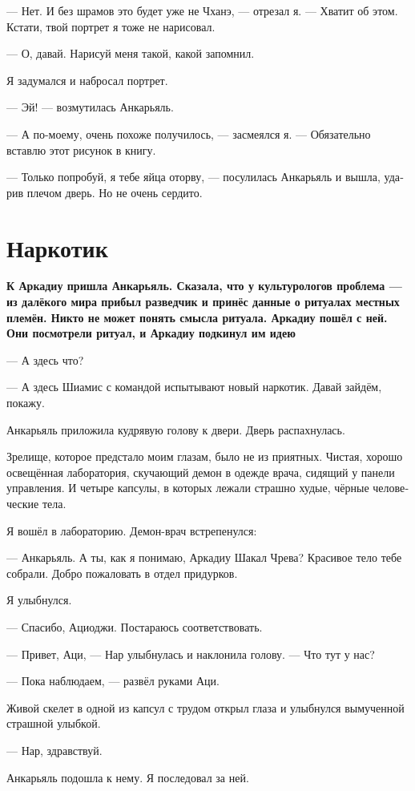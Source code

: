 \documentclass[a4paper,12pt,fleqn]{book}\usepackage{polyglossia}\setdefaultlanguage[babelshorthands=true]{russian}\setotherlanguage{english}\defaultfontfeatures{Ligatures=TeX,Mapping=tex-text}\usepackage{xcolor}\newcommand{\ml}[3]{#2}
\begin{document}
{--- Нет.
И без шрамов это будет уже не Чханэ, --- отрезал я.
--- Хватит об этом.
Кстати, твой портрет я тоже не нарисовал.

--- О, давай.
Нарисуй меня такой, какой запомнил.

Я задумался и набросал портрет.

--- Эй! --- возмутилась Анкарьяль.

--- А по-моему, очень похоже получилось, --- засмеялся я.
--- Обязательно вставлю этот рисунок в книгу.

--- Только попробуй, я тебе яйца оторву, --- посулилась Анкарьяль и вышла, ударив плечом дверь.
Но не очень сердито.

\section{Наркотик}

\textbf{К Аркадиу пришла Анкарьяль.
Сказала, что у культурологов проблема --- из далёкого мира прибыл разведчик и принёс данные о ритуалах местных племён.
Никто не может понять смысла ритуала.
Аркадиу пошёл с ней.
Они посмотрели ритуал, и Аркадиу подкинул им идею}

--- А здесь что?

--- А здесь Шиамис с командой испытывают новый наркотик.
Давай зайдём, покажу.

Анкарьяль приложила кудрявую голову к двери.
Дверь распахнулась.

Зрелище, которое предстало моим глазам, было не из приятных.
Чистая, хорошо освещённая лаборатория, скучающий демон в одежде врача, сидящий у панели управления.
И четыре капсулы, в которых лежали страшно худые, чёрные человеческие тела.

Я вошёл в лабораторию.
Демон-врач встрепенулся:

--- Анкарьяль.
А ты, как я понимаю, Аркадиу Шакал Чрева?
Красивое тело тебе собрали.
Добро пожаловать в отдел придурков.

Я улыбнулся.

--- Спасибо, Ациоджи.
Постараюсь соответствовать.

--- Привет, Аци, --- Нар улыбнулась и наклонила голову.
--- Что тут у нас?

--- Пока наблюдаем, --- развёл руками Аци.

Живой скелет в одной из капсул с трудом открыл глаза и улыбнулся вымученной страшной улыбкой.

--- Нар, здравствуй.

Анкарьяль подошла к нему.
Я последовал за ней.

}
\end{document}

